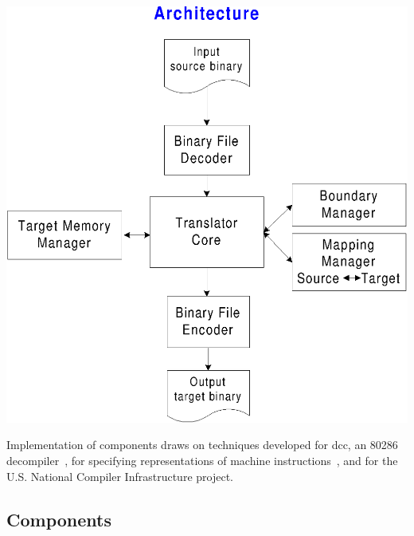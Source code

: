 \centerfigbegin
\resizebox{!}{10cm}
{\includegraphics{figures/uqbt_architecture.eps}}

Implementation of components draws on techniques developed for
dcc, an 80286 decompiler~\cite{Cifu95}, for specifying
representations of machine instructions~\cite{Rams97},
and for the U.S. National Compiler Infrastructure project.


\subsection{Components}


